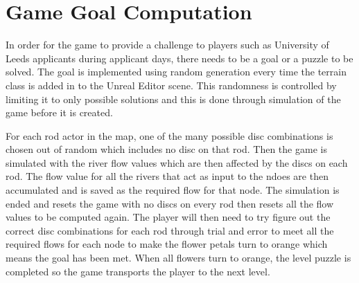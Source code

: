 \section{Game Goal Computation}
In order for the game to provide a challenge to players such as University of Leeds applicants during applicant days, there needs to be a goal or a puzzle to be solved. The goal is implemented using random generation every time the terrain class is added in to the Unreal Editor scene. This randomness is controlled by limiting it to only possible solutions and this is done through simulation of the game before it is created.
\newline
\par
For each rod actor in the map, one of the many possible disc combinations is chosen out of random which includes no disc on that rod. Then the game is simulated with the river flow values which are then affected by the discs on each rod. The flow value for all the rivers that act as input to the ndoes are then accumulated and is saved as the required flow for that node. The simulation is ended and resets the game with no discs on every rod then resets all the flow values to be computed again. The player will then need to try figure out the correct disc combinations for each rod through trial and error to meet all the required flows for each node to make the flower petals turn to orange which means the goal has been met. When all flowers turn to orange, the level puzzle is completed so the game transports the player to the next level.